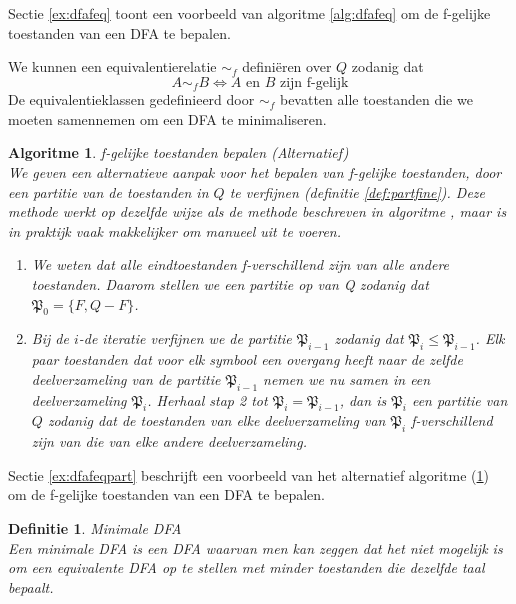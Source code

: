 \documentclass[a4paper]{article}
\newtheorem{tdefinitie}{Definitie}[section]
\newenvironment{definitie}[1]%
  {\begin{mdframed}[backgroundcolor=silver,
    topline=false,
    rightline=false,
    leftline=false,
    bottomline=false]\begin{tdefinitie}#1\\\normalfont}%
  {\end{tdefinitie}\end{mdframed}}
\newtheorem{talgo}{Algoritme}[section]
\newenvironment{algoritme}[1]%
  {\begin{mdframed}[backgroundcolor=silver,
    topline=false,
    rightline=false,
    leftline=false,
    bottomline=false]\begin{talgo}#1\\\normalfont}%
  {\end{talgo}\end{mdframed}}
\newenvironment{enumalgo}%
  {\begin{enumerate}[leftmargin=1.5cm,label=Stap \arabic*:]}%
  {\end{enumerate}}
\newcommand{\partition}{\ensuremath{\mathfrak{P}}}
\begin{document}
Sectie \ref{ex:dfafeq} toont een voorbeeld van algoritme \ref{alg:dfafeq} om de f-gelijke toestanden van een DFA te bepalen.

We kunnen een equivalentierelatie $\sim_f$ defini\"eren over $Q$ zodanig dat
\begin{equation*}
A \sim_f B \Leftrightarrow A \text{ en } B \text{ zijn f-gelijk}
\end{equation*}
De equivalentieklassen gedefinieerd door $\sim_f$ bevatten alle toestanden die we moeten samennemen om een DFA te minimaliseren.

\begin{algoritme}{f-gelijke toestanden bepalen (Alternatief)}
  \label{alg:dfafeqpart}
  We geven een alternatieve aanpak voor het bepalen van f-gelijke toestanden, door een partitie van de toestanden in $Q$ te verfijnen (definitie \ref{def:partfine}). Deze methode werkt op dezelfde wijze als de methode beschreven in algoritme \label{alg:dfafeq}, maar is in praktijk vaak makkelijker om manueel uit te voeren.
  \begin{enumalgo}
  \item We weten dat alle eindtoestanden f-verschillend zijn van alle andere toestanden. Daarom stellen we een partitie op van Q zodanig dat $\partition_0 = \{F, Q-F\}$.
  \item Bij de $i$-de iteratie verfijnen we de partitie $\partition_{i-1}$ zodanig dat $\partition_i \leq \partition_{i-1}$. Elk paar toestanden dat voor elk symbool een overgang heeft naar de zelfde deelverzameling van de partitie $\partition_{i-1}$ nemen we nu samen in een deelverzameling $\partition_i$. Herhaal stap 2 tot $\partition_i = \partition_{i-1}$, dan is $\partition_i$ een partitie van $Q$ zodanig dat de toestanden van elke deelverzameling van $\partition_i$ f-verschillend zijn van die van elke andere deelverzameling.
  \end{enumalgo}
\end{algoritme}

Sectie \ref{ex:dfafeqpart} beschrijft een voorbeeld van het alternatief algoritme (\ref{alg:dfafeqpart}) om de f-gelijke toestanden van een DFA te bepalen.

\begin{definitie}{Minimale DFA}
  Een minimale DFA is een DFA waarvan men kan zeggen dat het niet mogelijk is om een equivalente DFA op te stellen met minder toestanden die dezelfde taal bepaalt.
\end{definitie}
\end{document}
